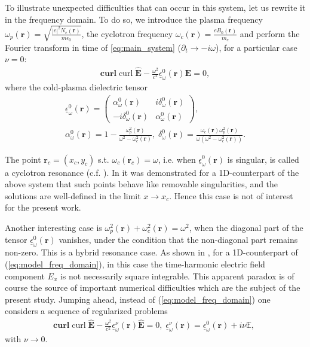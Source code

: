 {To illustrate unexpected difficulties that can occur in this system, let us rewrite it in the frequency domain. To do so, 
we introduce the plasma frequency $\omega_p(\mathbf{r})=\sqrt{\frac{|e|^2N_e(\mathbf{r})}{m\epsilon_0}}$, 
the cyclotron frequency $\omega_c(\mathbf{r})=\frac{e B_0(\mathbf{r})}{m_e}$ and perform the Fourier transform 
in time of \ref{eq:main_system} ($\partial_t\rightarrow -i\omega$), for a 
particular case $\nu=0$:
\begin{align}
\label{eq:model_freq_domain}
 \mathbf{curl}{\operatorname{curl}}\hat{\mathbf{E}}-\frac{\omega^2}{c^2}\underline{\epsilon}^{0}_{\omega}(\mathbf{r})\hat{\mathbf{E}}=0,
\end{align}
where the cold-plasma dielectric tensor \cite[Chapter 1-2]{Stix}
\begin{align}
\nonumber
\underline{\epsilon}^{0}_{\omega}(\mathbf{r})=\left(
 \begin{matrix}
  \alpha_{\omega}^{0}(\mathbf{r}) & i\delta_{\omega}^{0}(\mathbf{r})\\
  -i\delta_{\omega}^{0}(\mathbf{r}) & \alpha_{\omega}^{0}(\mathbf{r})
 \end{matrix}
\right),\\
\label{eq:alpha_delta}
\alpha_{\omega}^{0}(\mathbf{r})=1-\frac{\omega_p^2(\mathbf{r})}{\omega^2-\omega_c^2(\mathbf{r})},\; \delta_{\omega}^{0}(\mathbf{r})=\frac{\omega_c(\mathbf{r})\omega_p^2(\mathbf{r})}{\omega(\omega^2-\omega_c^2(\mathbf{r}))}.
\end{align}

The point $\mathbf{r}_c=(x_c,y_c)$ s.t. $\omega_c(\mathbf{r}_c)=\omega$, i.e. when $\underline{\epsilon}_{\omega}^{0}(\mathbf{r})$ is singular, is called a cyclotron resonance (c.f. \cite[Chapter 1-5]{Stix}). 
In \cite{singular_solutions} it was demonstrated for a 1D-counterpart of the above system that such points behave like removable singularities, 
and the solutions are well-defined in the limit $x\rightarrow x_c$. Hence this case is not of interest for the present work. 

Another interesting case is $\omega_p^2(\mathbf{r})+\omega_c^2(\mathbf{r})=\omega^2$, when the diagonal part of the tensor $\underline{\epsilon}_{\omega}^{0}(\mathbf{r})$ vanishes, 
under the condition that the non-diagonal part remains non-zero. This is a hybrid resonance case. 
As shown in \cite{Despres_2014, singular_solutions}, for a 1D-counterpart of (\ref{eq:model_freq_domain}), in this case the time-harmonic electric field component $E_x$ is not necessarily square 
integrable. This apparent paradox is of course the source of important numerical difficulties which are the subject of the present study.  
Jumping ahead, instead of (\ref{eq:model_freq_domain}) 
one considers a sequence of regularized problems
\begin{align}
\label{eq:seq_regularized}
  \mathbf{curl}{\operatorname{curl}}\hat{\mathbf{E}}-\frac{\omega^2}{c^2}\underline{\epsilon}^{\nu}_{\omega}(\mathbf{r})\hat{\mathbf{E}}=0,\;
  \underline{\epsilon}^{\nu}_{\omega}(\mathbf{r})= \underline{\epsilon}^{0}_{\omega}(\mathbf{r})+i\nu \mathbb{E},\; 
\end{align}
with $\nu\rightarrow 0$. 
}


